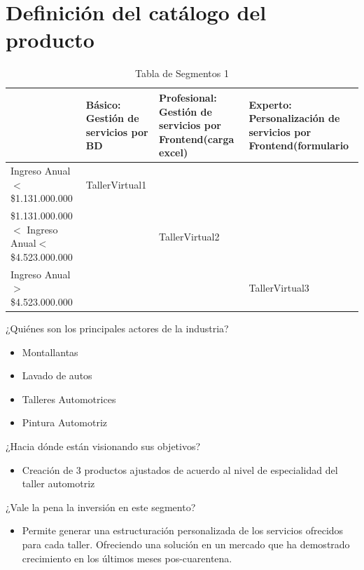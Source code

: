 \documentclass[10pt,a4paper,openany]{book}
\begin{document}
\vspace{4cm}
\section{Definición del catálogo del producto}


\begin{table}[htbp]
\centering
\begin{tabular}{|p{5cm}|p{3cm}|p{3cm}|p{3cm}|} \hline
	& \textbf{Básico:} Gestión de servicios por BD  
	& \textbf{Profesional:} Gestión de servicios por Frontend(carga excel)  
	& \textbf{Experto:} Personalización de servicios por Frontend(formulario \\[0.5ex] \hline
Ingreso Anual$<$ \$1.131.000.000	                & TallerVirtual1  &  &  \\[0.5ex] \hline
\$1.131.000.000$<$ Ingreso Anual$<$ \$4.523.000.000	&   & TallerVirtual2 &  \\[0.5ex] \hline
Ingreso Anual $>$ \$4.523.000.000	                &   &  & TallerVirtual3 \\[0.5ex] \hline

\end{tabular}
\caption{Tabla de Segmentos 1}
\label{table:t16}
\end{table}

¿Quiénes son los principales actores de la industria?
\begin{itemize}
	\item Montallantas
	\item Lavado de autos
	\item Talleres Automotrices
	\item Pintura Automotriz
\end{itemize} 

¿Hacia dónde están visionando sus objetivos?
\begin{itemize}
	\item Creación de 3  productos ajustados de acuerdo al nivel de especialidad del taller automotriz
\end{itemize} 

¿Vale la pena la inversión en este segmento?
\begin{itemize}
	\item Permite generar una estructuración personalizada de los servicios ofrecidos para cada taller. Ofreciendo una solución en un mercado que ha demostrado crecimiento en los últimos meses pos-cuarentena.
\end{itemize}
\end{document}
